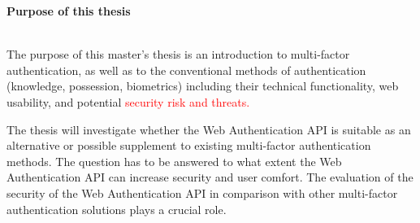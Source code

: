 \thispagestyle{empty}

{}

\begin{large}
	\textbf{Purpose of this thesis} \\ \\
\end{large}

The purpose of this master's thesis is an introduction to multi-factor authentication, as well as to the conventional methods of authentication (knowledge, possession, biometrics) including their technical functionality, web usability, and potential \textcolor{red}{security risk and threats.}

The thesis will investigate whether the Web Authentication API is suitable as an alternative or possible supplement to existing multi-factor authentication methods. The question has to be answered to what extent the Web Authentication API can increase security and user comfort. The evaluation of the security of the Web Authentication API in comparison with other multi-factor authentication solutions plays a crucial role.

\newpage